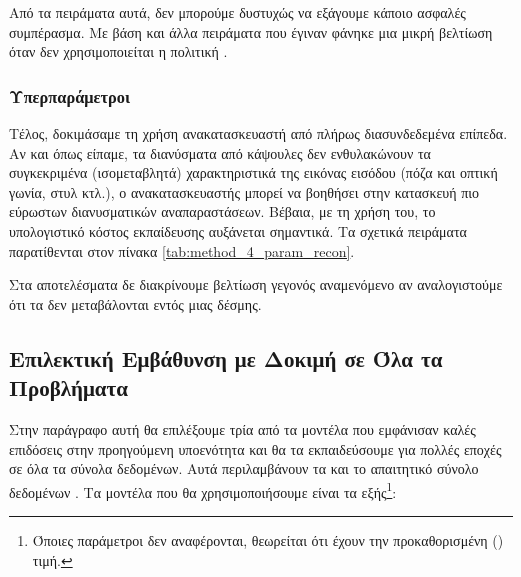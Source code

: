 Από τα πειράματα αυτά, δεν μπορούμε δυστυχώς να εξάγουμε κάποιο ασφαλές συμπέρασμα. Με βάση και άλλα πειράματα που έγιναν φάνηκε μια μικρή βελτίωση όταν δεν χρησιμοποιείται η πολιτική .

\subsubsection{Υπερπαράμετροι }

Τέλος, δοκιμάσαμε τη χρήση ανακατασκευαστή από πλήρως διασυνδεδεμένα επίπεδα. Αν και όπως είπαμε, τα διανύσματα από κάψουλες δεν ενθυλακώνουν τα συγκεκριμένα (ισομεταβλητά) χαρακτηριστικά της εικόνας εισόδου (πόζα και οπτική γωνία, στυλ κτλ.), ο ανακατασκευαστής μπορεί να βοηθήσει στην κατασκευή πιο εύρωστων διανυσματικών αναπαραστάσεων. Βέβαια, με τη χρήση του, το υπολογιστικό κόστος εκπαίδευσης αυξάνεται σημαντικά. Τα σχετικά πειράματα παρατίθενται στον πίνακα \ref{tab:method_4_param_recon}.


\begin{table}[h]
    \begin{center}
    \end{center}
    \caption[]{\label{tab:method_4_param_recon}Επίδραση της παραμέτρου  της μεθόδου 4 στην επίδοση στο σύνολο δεδομένων ελέγχου . Τα πειράματα αυτά πραγματοποιήθηκαν για 10 εποχές με μέγεθος δέσμης ίσο με 8.} 
\end{table}

Στα αποτελέσματα δε διακρίνουμε βελτίωση γεγονός αναμενόμενο αν αναλογιστούμε ότι τα  δεν μεταβάλονται εντός μιας δέσμης.

\subsection{Επιλεκτική Εμβάθυνση με Δοκιμή σε Όλα τα Προβλήματα}
Στην παράγραφο αυτή θα επιλέξουμε τρία από τα μοντέλα που εμφάνισαν καλές επιδόσεις στην προηγούμενη υποενότητα και θα τα εκπαιδεύσουμε για πολλές εποχές σε όλα τα σύνολα δεδομένων. Αυτά περιλαμβάνουν τα  και το απαιτητικό σύνολο δεδομένων . Τα μοντέλα που θα χρησιμοποιήσουμε είναι τα εξής\footnote{Όποιες παράμετροι δεν αναφέρονται, θεωρείται ότι έχουν την προκαθορισμένη () τιμή.}:


